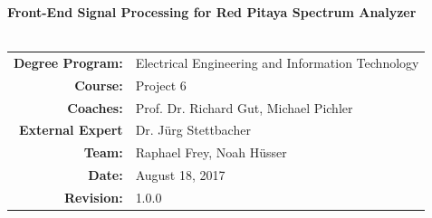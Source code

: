 \documentclass[a4paper,twoside]{alpenthesis/alpenthesis}
\begin{document}
%
%
\begin{titlingpage}
    \flushright\sffamily
    \enlargethispage{10ex}

    \vspace*{5em}
    
    \Huge\bfseries{Front-End Signal Processing for Red Pitaya Spectrum Analyzer}\\[1ex]
    \Large{}\\[3ex]

    \normalsize\mdseries

    

    \vfill
    \begin{tabular}{>{\bfseries}rl}
        Degree Program: & Electrical Engineering and Information Technology \\[2mm]
        Course:         & Project \num{6}\\[2mm]
        Coaches:        & Prof. Dr. Richard Gut, Michael Pichler \\[2mm]
        External Expert & Dr. J\"urg Stettbacher \\[2mm]
        Team:           & Raphael Frey, Noah H\"usser \\[2mm]
        Date:           & August 18, 2017 \\[2mm]
        Revision:       & 1.0.0 \\[2mm]
    \end{tabular}

    \tikzexternaldisable
    \tikzexternalenable
\end{titlingpage} %
\end{document}
